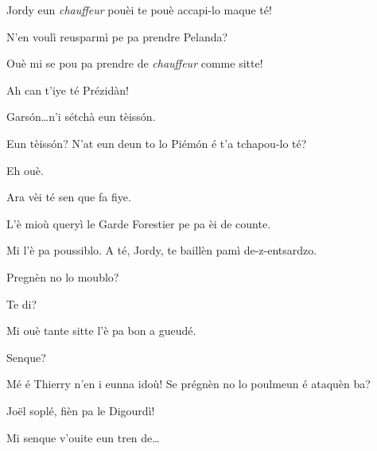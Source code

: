 \begin{drama}
\Joelspeaks Jordy eun \textit{chauffeur} pouèi te pouè accapi-lo maque té!

\Jordyspeaks N'en voulì reusparmì pe pa prendre Pelanda? 

\Joelspeaks Ouè mi se pou pa prendre de \textit{chauffeur} comme sitte!

\Thierryspeaks{} Ah can t'iye té Prézidàn!


\Chauffeurspeaks Gars\'on\ldots n'i sétchà eun tèiss\'on.

\Joelspeaks Eun tèiss\'on? N'at eun deun to lo Piém\'on é t'a tchapou-lo té?

\Chauffeurspeaks Eh ouè.

\Joelspeaks Ara vèi té sen que fa fiye.

\Chauffeurspeaks L'è mioù queryì le Garde Forestier pe pa èi de counte.


\Joelspeaks Mi l'è pa poussiblo. A té, Jordy, te baillèn pamì de-z-entsardzo.

\Thierryspeaks{} Pregnèn no lo moublo?

\Joelspeaks Te di?

\Thierryspeaks  Mi ouè tante sitte l'è pa bon a gueudé.

\Jordyspeaks Senque?

\Joelspeaks{} Mé é Thierry n'en i eunna idoù! Se prégnèn no lo poulmeun é ataquèn ba?


\Joellespeaks{} Jo\"{e}l soplé, fièn pa le Digourdì!


\Chauffeurspeaks Mi senque v'ouite eun tren de\ldots





\end{drama}
